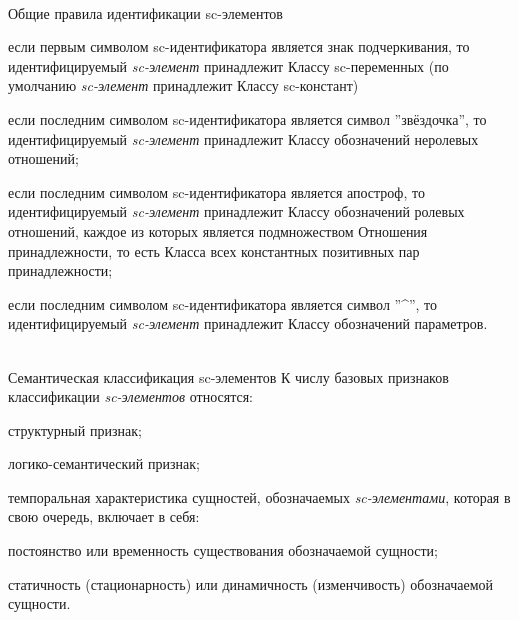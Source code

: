 \begin{frame}{\\Общие правила идентификации sc-элементов}
	\vspace{10mm}
	\begin{SCn}
		\begin{textitemize}
			\item если первым символом sc-идентификатора является знак подчеркивания, то идентифицируемый \textit{sc-элемент} принадлежит Классу sc-переменных (по умолчанию \textit{sc-элемент} принадлежит Классу sc-констант)
			\item если последним символом sc-идентификатора является символ ''звёздочка'', то идентифицируемый \textit{sc-элемент} принадлежит Классу обозначений неролевых отношений;
			\item если последним символом sc-идентификатора является апостроф, то идентифицируемый \textit{sc-элемент} принадлежит Классу обозначений ролевых отношений, каждое из которых является подмножеством Отношения принадлежности, то есть Класса всех константных позитивных пар принадлежности;
			\item если последним символом sc-идентификатора является символ ''\textasciicircum'', то идентифицируемый \textit{sc-элемент} принадлежит Классу обозначений параметров.
		\end{textitemize}
	\end{SCn}
\end{frame}

\begin{frame}{\\Семантическая классификация sc-элементов}
	К числу базовых признаков классификации \textit{sc-элементов} относятся:
	\begin{textitemize}
		\item структурный признак;
		\item логико-семантический признак;
		\item темпоральная характеристика сущностей, обозначаемых \textit{sc-элементами}, которая в свою очередь, включает в себя:
		\begin{textitemize}
			\item постоянство или временность существования обозначаемой сущности;
			\item статичность (стационарность) или динамичность (изменчивость) обозначаемой сущности.
		\end{textitemize}
	\end{textitemize}
\end{frame}

